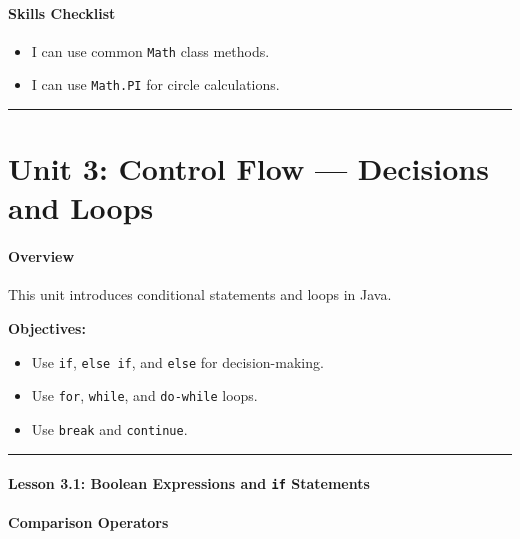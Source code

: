 \documentclass[
  justified,
  openright,
]{tufte-book}
\let\subsection\paragraph
\let\paragraph\paragraph
\let\subsection\paragraph
\let\paragraph\paragraph
\providecommand{\tightlist}{%
  \setlength{\itemsep}{0pt}\setlength{\parskip}{0pt}}
\begin{document}
\subsection{Skills Checklist}\label{skills-checklist-73}

\begin{itemize}
\tightlist
\item[$\square$]
  I can use common \texttt{Math} class methods.
\item[$\square$]
  I can use \texttt{Math.PI} for circle calculations.
\end{itemize}

\begin{center}\rule{0.5\linewidth}{0.5pt}\end{center}

\section{Unit 3: Control Flow --- Decisions and
Loops}\label{unit-3-control-flow-decisions-and-loops-3}

\subsection{Overview}\label{overview-17}

This unit introduces conditional statements and loops in Java.

\textbf{Objectives:}

\begin{itemize}
\tightlist
\item
  Use \texttt{if}, \texttt{else\ if}, and \texttt{else} for
  decision-making.
\item
  Use \texttt{for}, \texttt{while}, and \texttt{do-while} loops.
\item
  Use \texttt{break} and \texttt{continue}.
\end{itemize}

\begin{center}\rule{0.5\linewidth}{0.5pt}\end{center}

\subsection{\texorpdfstring{Lesson 3.1: Boolean Expressions and
\texttt{if}
Statements}{Lesson 3.1: Boolean Expressions and if Statements}}\label{lesson-3.1-boolean-expressions-and-if-statements-2}

\subsection{Comparison Operators}\label{comparison-operators-1}
\end{document}
